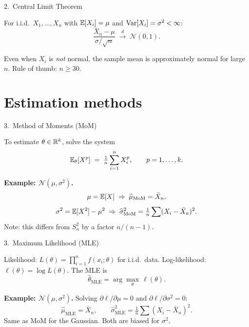 \documentclass[aspectratio=169]{beamer}
\begin{document}
\begin{frame}{2.~Central Limit Theorem}
  \begin{thbox}[CLT]
    For i.i.d.\ $X_1, \dots, X_n$ with $\mathbb{E}[X_i] = \mu$ and
    $\mathrm{Var}[X_i] = \sigma^2 < \infty$:
    \[
      \frac{\bar{X}_n - \mu}{\sigma / \sqrt{n}}
      \;\xrightarrow{d}\; \mathcal{N}(0, 1).
    \]
  \end{thbox}
  \medskip
  \begin{infobox}
    Even when $X_i$ is \emph{not} normal, the sample mean is
    approximately normal for large $n$. Rule of thumb: $n \geq 30$.
  \end{infobox}
\end{frame}

\section{Estimation methods}

\begin{frame}{3.~Method of Moments (MoM)}
  \begin{defbox}[MoM]
    To estimate $\theta \in \mathbb{R}^k$, solve the system
    \[
      \mathbb{E}_\theta[X^p] \;=\; \tfrac{1}{n}\sum_{i=1}^{n} X_i^p,
      \qquad p = 1, \dots, k.
    \]
  \end{defbox}
  \medskip
  \textbf{Example: $\mathcal{N}(\mu, \sigma^2)$.}
  \[
    \mu = \mathbb{E}[X] \;\Rightarrow\; \widehat{\mu}_{\text{MoM}} = \bar{X}_n,
  \]
  \[
    \sigma^2 = \mathbb{E}[X^2] - \mu^2 \;\Rightarrow\;
    \widehat{\sigma}^2_{\text{MoM}} = \tfrac{1}{n}\sum(X_i - \bar{X}_n)^2.
  \]
  Note: this differs from $S_n^2$ by a factor $n / (n-1)$.
\end{frame}

\begin{frame}{3.~Maximum Likelihood (MLE)}
  \begin{defbox}
    Likelihood:
    $L(\theta) = \prod_{i=1}^{n} f(x_i; \theta)$ for i.i.d.\ data.
    Log-likelihood: $\ell(\theta) = \log L(\theta)$.
    The MLE is
    \[
      \widehat{\theta}_{\text{MLE}} = \arg\max_\theta\, \ell(\theta).
    \]
  \end{defbox}
  \medskip
  \textbf{Example: $\mathcal{N}(\mu, \sigma^2)$.}
  Solving $\partial \ell / \partial \mu = 0$ and
  $\partial \ell / \partial \sigma^2 = 0$:
  \[
    \widehat{\mu}_{\text{MLE}} = \bar{X}_n,
    \qquad
    \widehat{\sigma}^2_{\text{MLE}} = \tfrac{1}{n}\sum(X_i - \bar{X}_n)^2.
  \]
  Same as MoM for the Gaussian. Both are biased for $\sigma^2$.
\end{frame}
\end{document}

